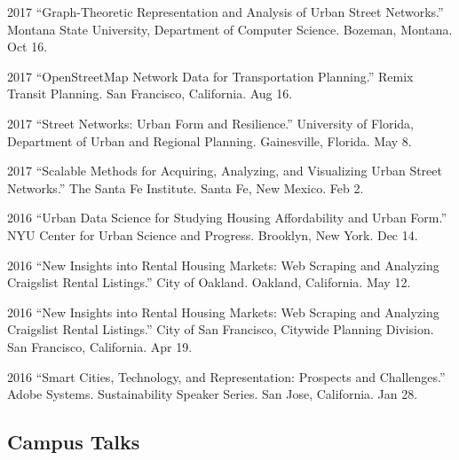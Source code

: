 \documentclass[12pt,letterpaper]{report}
\begin{document}
\begin{tablist}
        \item[2017] \tab \enquote{Graph-Theoretic Representation and Analysis of Urban Street Networks.} Montana State University, Department of Computer Science. Bozeman, Montana. Oct 16.

        \item[2017] \tab \enquote{OpenStreetMap Network Data for Transportation Planning.} Remix Transit Planning. San Francisco, California. Aug 16.

        \item[2017] \tab \enquote{Street Networks: Urban Form and Resilience.} University of Florida, Department of Urban and Regional Planning. Gainesville, Florida. May 8.

        \item[2017] \tab \enquote{Scalable Methods for Acquiring, Analyzing, and Visualizing Urban Street Networks.} The Santa Fe Institute. Santa Fe, New Mexico. Feb 2.

        \item[2016] \tab \enquote{Urban Data Science for Studying Housing Affordability and Urban Form.} NYU Center for Urban Science and Progress. Brooklyn, New York. Dec 14.

        \item[2016] \tab \enquote{New Insights into Rental Housing Markets: Web Scraping and Analyzing Craigslist Rental Listings.} City of Oakland. Oakland, California. May 12.

        \item[2016] \tab \enquote{New Insights into Rental Housing Markets: Web Scraping and Analyzing Craigslist Rental Listings.} City of San Francisco, Citywide Planning Division. San Francisco, California. Apr 19.

        \item[2016] \tab \enquote{Smart Cities, Technology, and Representation: Prospects and Challenges.} Adobe Systems. Sustainability Speaker Series. San Jose, California. Jan 28.

    \end{tablist}

    \subsection*{Campus Talks}
\end{document}
